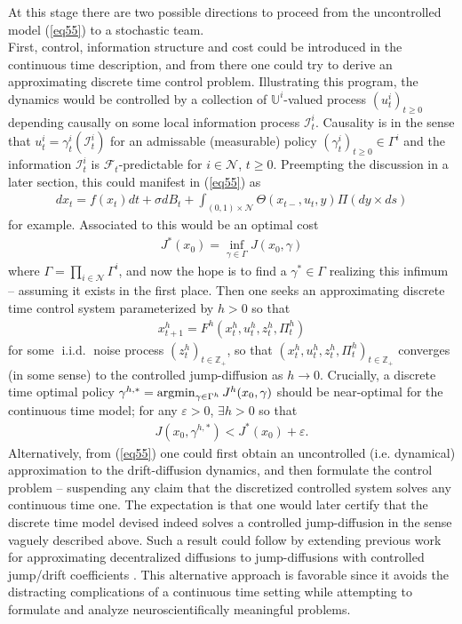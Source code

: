 \documentclass[12pt, oneside]{report}
\newcommand{\mbb}[1]{\mathbb{#1}}
\newcommand{\1}[1]{\mathbbm{1}_{\{#1\}}}
\newcommand{\mc}[1]{\mathcal{#1}}
\DeclareMathOperator{\iid}{i.i.d.}
\theoremstyle{definition}
\begin{document}
At this stage there are two possible directions to proceed from the uncontrolled
model (\ref{eq55}) to a stochastic team.\\[5pt]
\indent First, control, information structure and cost could be introduced in
the continuous time description, and from there one could try to derive an
approximating discrete time control problem. Illustrating this program, the
dynamics would be controlled by a collection of $\mbb{U}^i$-valued process
$(u^i_t)_{t\geq 0}$ depending causally on some local information process
$\mc{I}^i_t$. Causality is in the sense that $u^i_t=\gamma^i_t(\mc{I}^i_t)$ for
an admissable (measurable) policy $(\gamma^i_t)_{t\geq 0}\in\Gamma^i$ and the
information $\mc{I}^i_t$ is $\mc{F}_t$-predictable for $i\in\mc{N}$, $t\geq 0$.
Preempting the discussion in a later section, this could manifest in
(\ref{eq55}) as
\begin{align*}
    dx_t=f(x_t)dt+\sigma dB_t+\int_{(0,1)\times\mc{N}}\Theta(x_{t-},u_t,y)\Pi(dy\times ds)
\end{align*}
for example. Associated to this would be an optimal cost
\begin{align*}
    J^\ast(x_0)=\inf_{\gamma\in\Gamma}J(x_0,\gamma)
\end{align*}
where $\Gamma=\prod_{i\in\mc{N}}\Gamma^i$, and now the hope is to find a
$\gamma^\ast\in \Gamma$ realizing this infimum -- assuming it exists in the
first place. Then one seeks an approximating discrete time control system
parameterized by $h>0$ so that 
\begin{align*}
    x^h_{t+1}=F^h(x^h_t,u^h_t,z^h_t,\Pi^h_t)
\end{align*}
for some $\iid$ noise process $(z^h_t)_{t\in\mbb{Z}_+}$, so that
$(x^h_t,u^h_t,z^h_t,\Pi^h_t)_{t\in\mbb{Z}_+}$ converges (in some sense) to the
controlled jump-diffusion as $h\rightarrow 0$. Crucially, a discrete time
optimal policy $\gamma^{h,\ast}=\operatorname{argmin}_{\gamma\in\Gamma^h}J^h(x_0,\gamma)$
should be near-optimal for the continuous time model; for any $\varepsilon>0$,
$\exists h>0$ so that 
\begin{align*}
    J(x_0,\gamma^{h,\ast})<J^\ast(x_0)+\varepsilon.
\end{align*}
\indent Alternatively, from (\ref{eq55}) one could first obtain an uncontrolled
(i.e. dynamical) approximation to the drift-diffusion dynamics, and then
formulate the control problem -- suspending any claim that the discretized
controlled system solves any continuous time one. The expectation is that one
would later certify that the discrete time model devised indeed solves a
controlled jump-diffusion in the sense vaguely described above. Such a result
could follow by extending previous work for approximating decentralized
diffusions \cite[\S 5.4, theorem 5.5]{Pradhan_Yüksel_2023} to jump-diffusions
with controlled jump/drift coefficients \cite{Kushner_2000}. This alternative
approach is favorable since it avoids the distracting complications of a
continuous time setting while attempting to formulate and analyze
neuroscientifically meaningful problems.
\end{document}
